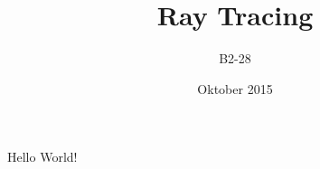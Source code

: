 \documentclass{article}
\title{Ray Tracing}
\author{B2-28}
\date{Oktober 2015}
\begin{document}
    \maketitle
        Hello World!


\end{document}
